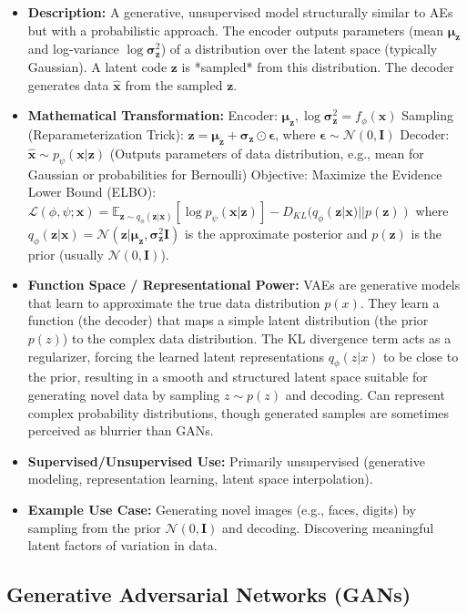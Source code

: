\documentclass{article}
\newcommand{\bz}{\bm{z}}
\newcommand{\bx}{\bm{x}}
\newcommand{\bmu}{\bm{\mu}}
\newcommand{\bsigma}{\bm{\sigma}}
\newcommand{\bepsilon}{\bm{\epsilon}}
\newcommand{\bI}{\mathbf{I}}
\begin{document}
\begin{itemize}
    \item \textbf{Description:} A generative, unsupervised model structurally similar to AEs but with a probabilistic approach. The encoder outputs parameters (mean $\bmu_{\bz}$ and log-variance $\log \bsigma_{\bz}^2$) of a distribution over the latent space (typically Gaussian). A latent code $\bz$ is *sampled* from this distribution. The decoder generates data $\hat{\bx}$ from the sampled $\bz$.
    \item \textbf{Mathematical Transformation:}
        Encoder: $\bmu_{\bz}, \log \bsigma_{\bz}^2 = f_{\phi}(\bx)$
        Sampling (Reparameterization Trick): $\bz = \bmu_{\bz} + \bsigma_{\bz} \odot \bepsilon$, where $\bepsilon \sim \mathcal{N}(0, \bI)$
        Decoder: $\hat{\bx} \sim p_{\psi}(\bx | \bz)$ (Outputs parameters of data distribution, e.g., mean for Gaussian or probabilities for Bernoulli)
        Objective: Maximize the Evidence Lower Bound (ELBO):
        $\mathcal{L}(\phi, \psi; \bx) = \mathbb{E}_{\bz \sim q_{\phi}(\bz|\bx)}[\log p_{\psi}(\bx|\bz)] - D_{KL}(q_{\phi}(\bz|\bx) || p(\bz))$
        where $q_{\phi}(\bz|\bx) = \mathcal{N}(\bz | \bmu_{\bz}, \bsigma_{\bz}^2 \bI)$ is the approximate posterior and $p(\bz)$ is the prior (usually $\mathcal{N}(0, \bI)$).
    \item \textbf{Function Space / Representational Power:} VAEs are generative models that learn to approximate the true data distribution $p(x)$. They learn a function (the decoder) that maps a simple latent distribution (the prior $p(z)$) to the complex data distribution. The KL divergence term acts as a regularizer, forcing the learned latent representations $q_\phi(z|x)$ to be close to the prior, resulting in a smooth and structured latent space suitable for generating novel data by sampling $z \sim p(z)$ and decoding. Can represent complex probability distributions, though generated samples are sometimes perceived as blurrier than GANs.
    \item \textbf{Supervised/Unsupervised Use:} Primarily unsupervised (generative modeling, representation learning, latent space interpolation).
    \item \textbf{Example Use Case:} Generating novel images (e.g., faces, digits) by sampling from the prior $\mathcal{N}(0, \bI)$ and decoding. Discovering meaningful latent factors of variation in data.
\end{itemize}

\subsection{Generative Adversarial Networks (GANs)}
\end{document}
